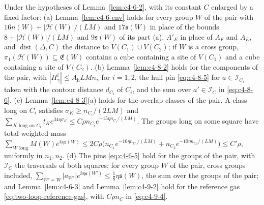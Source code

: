 \begin{lemma}\label{lem:two-loop-pins}
Under the hypotheses of Lemma~\ref{lem:c4-6-2}, with its constant $C$ enlarged by a fixed factor:
(a) Lemma~\ref{lem:c4-6-env} holds for every group $W$ of the pair with $16n(W)+|\mathcal H(W)|/(LM)$ and $17\mathfrak s(W)$ in place of the bounds $8+|\mathcal H(W)|/(LM)$ and $9\mathfrak s(W)$ of its part (a), $A'_E$ in place of $A_F$ and $A_E$, and $\operatorname{dist}(\Delta,C)$ the distance to $V(C_1)\cup V(C_2)$; if $W$ is a cross group, $\pi_1(\mathcal H(W))\subseteq\mathfrak E(W)$ contains a cube containing a site of $V(C_1)$ and a cube containing a site of $V(C_2)$.
(b) Lemma~\ref{lem:c4-8-2} holds for the components of the pair, with $|H^i_\gamma|\leq A_{\mathrm h}LMn_\gamma$ for $i=1,2$, the hull pin \eqref{eq:c4-8-5} for $a\in\mathcal I_{C_i}$ taken with the contour distance $d_{C_i}$ of $C_i$, and the sum over $a'\in\mathcal I_C$ in \eqref{eq:c4-8-6}.
(c) Lemma~\ref{lem:c4-8-3}(a) holds for the overlap classes of the pair. A class long on $C_i$ satisfies $\sigma_K\geq n_{C_i}/(2LM)$ and $\sum_{K\text{ long on }C_i}t_Ke^{34\eta\sigma_K}\leq C\rho n_{C_i}e^{-15\eta n_{C_i}/(LM)}$. The groups long on some square have total weighted mass $\sum_{W\text{ long}}M(W)e^{4\eta\mathfrak s(W)}\leq2C\rho\bigl(n_{C_1}e^{-10\eta n_{C_1}/(LM)}+n_{C_2}e^{-10\eta n_{C_2}/(LM)}\bigr)\leq C'\rho$, uniformly in $n_1,n_2$.
(d) The pins \eqref{eq:c4-6-5} hold for the groups of the pair, with $\mathcal I_C$ the traversals of both squares; for every group $W$ of the pair, cross groups included, $\sum_{W'\not\sim W}|a_{W'}|e^{3\eta\mathfrak s(W')}\leq\frac18\eta\mathfrak s(W)$, the sum over the groups of the pair; and Lemma~\ref{lem:c4-6-3} and Lemma~\ref{lem:c4-9-2} hold for the reference gas \eqref{eq:two-loop-reference-gas}, with $C\rho n_C$ in \eqref{eq:c4-9-4}.
\end{lemma}

